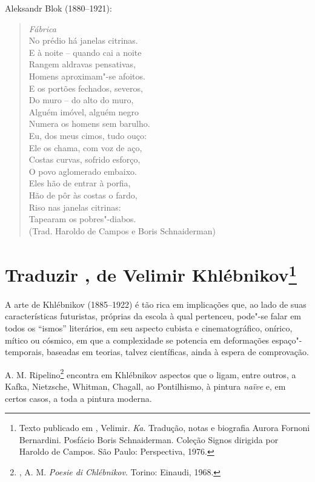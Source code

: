 \asterisc

Aleksandr Blok (1880--1921):

\begin{verse}
\emph{Fábrica}\\[8pt]
No prédio há janelas citrinas.\\
E à noite -- quando cai a noite\\
Rangem aldravas pensativas,\\
Homens aproximam"-se afoitos.\\[8pt]
E os portões fechados, severos,\\
Do muro -- do alto do muro,\\
Alguém imóvel, alguém negro\\
Numera os homens sem barulho.\\[8pt]
Eu, dos meus cimos, tudo ouço:\\
Ele os chama, com voz de aço,\\
Costas curvas, sofrido esforço,\\
O povo aglomerado embaixo.\\[8pt]
Eles hão de entrar à porfia,\\
Hão de pôr às costas o fardo,\\
Riso nas janelas citrinas:\\
Tapearam os pobres"-diabos.\\[8pt]
(Trad. Haroldo de Campos e Boris Schnaiderman)
\end{verse}

\chapter{Traduzir , de Velimir Khlébnikov\footnote{Texto
  publicado em , Velimir. \emph{Ka}. Tradução, notas e
  biografia Aurora Fornoni Bernardini. Posfácio Boris Schnaiderman.
  Coleção Signos dirigida por Haroldo de Campos. São Paulo: Perspectiva,
  1976.}}

A arte de Khlébnikov (1885--1922) é tão rica em implicações que, ao lado
de suas características futuristas, próprias da escola à qual pertenceu,
pode"-se falar em todos os ``ismos'' literários, em seu aspecto cubista e
cinematográfico, onírico, mítico ou cósmico, em que a complexidade se
potencia em deformações espaço"-temporais, baseadas em teorias, talvez
científicas, ainda à espera de comprovação.

A. M. Ripelino\footnote{, A. M. \emph{Poesie di Chlébnikov}.
  Torino: Einaudi, 1968.} encontra em Khlébnikov aspectos que o ligam,
entre outros, a Kafka, Nietzsche, Whitman, Chagall, ao Pontilhismo, à
pintura \emph{naïve} e, em certos casos, a toda a pintura moderna.

